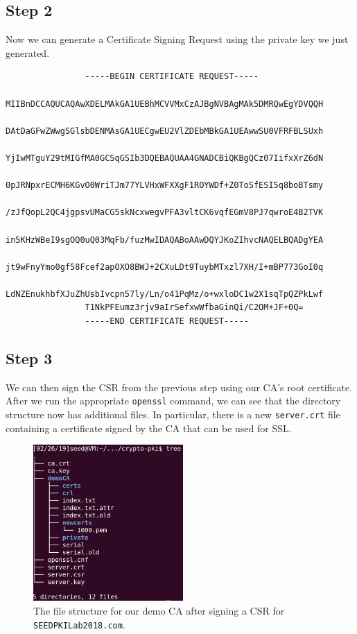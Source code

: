 \documentclass[12pt,letterpaper]{article}
\begin{document}
		\subsection*{Step 2}
			Now we can generate a Certificate Signing Request using the private key we just generated.
			
			\begin{verbatim}
				-----BEGIN CERTIFICATE REQUEST-----
				MIIBnDCCAQUCAQAwXDELMAkGA1UEBhMCVVMxCzAJBgNVBAgMAk5DMRQwEgYDVQQH
				DAtDaGFwZWwgSGlsbDENMAsGA1UECgwEU2VlZDEbMBkGA1UEAwwSU0VFRFBLSUxh
				YjIwMTguY29tMIGfMA0GCSqGSIb3DQEBAQUAA4GNADCBiQKBgQCz07IifxXrZ6dN
				0pJRNpxrECMH6KGvO0WriTJm77YLVHxWFXXgF1ROYWDf+Z0ToSfESI5q8boBTsmy
				/zJfQopL2QC4jgpsvUMaCG5skNcxwegvPFA3vltCK6vqfEGmV8PJ7qwroE4B2TVK
				in5KHzWBeI9sgOQ0uQ03MqFb/fuzMwIDAQABoAAwDQYJKoZIhvcNAQELBQADgYEA
				jt9wFnyYmo0gf58Fcef2apOXO8BWJ+2CXuLDt9TuybMTxzl7XH/I+mBP773GoI0q
				LdNZEnukhbfXJuZhUsbIvcpn57ly/Ln/o41PqMz/o+wxloDC1w2X1sqTpQZPkLwf
				T1NkPFEumz3rjv9aIrSefxwWfbaGinQi/C2OM+JF+0Q=
				-----END CERTIFICATE REQUEST-----
			\end{verbatim}
	
		\subsection*{Step 3}
			We can then sign the CSR from the previous step using our CA's root certificate. After we run the appropriate \texttt{openssl} command, we can see that the directory structure now has additional files. In particular, there is a new \texttt{server.crt} file containing a certificate signed by the CA that can be used for SSL.
			
			\begin{figure}[h!]
				\begin{center}
					\includegraphics[width=2.25in]{task-2-3-files}
				\end{center}
				\caption{The file structure for our demo CA after signing a CSR for \texttt{SEEDPKILab2018.com}.}
			\end{figure}
		
\end{document}
